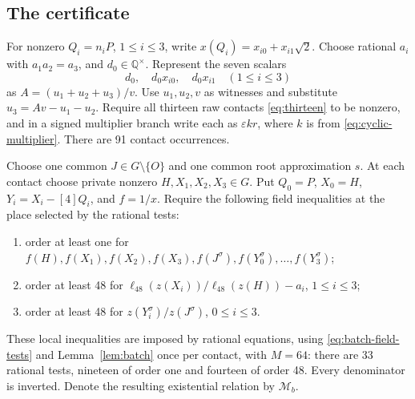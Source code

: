 \documentclass[11pt]{article}
\theoremstyle{definition}
\newcommand{\Q}{\mathbb Q}\newcommand{\Z}{\mathbb Z}
\begin{document}
\subsection{The certificate}
\label{sec:batched-multiplication}
For nonzero \(Q_i=n_iP\), \(1\le i\le3\), write
\(x(Q_i)=x_{i0}+x_{i1}\sqrt2\). Choose rational \(a_i\)
with \(a_1a_2=a_3\), and \(d_0\in\Q^\times\). Represent
the seven scalars
\begin{equation}\label{eq:shared-coordinates}
                   d_0,\quad d_0x_{i0},\quad d_0x_{i1}
                   \quad(1\le i\le3)
\end{equation}
as \(A=(u_1+u_2+u_3)/v\). Use \(u_1,u_2,v\) as witnesses
and substitute \(u_3=Av-u_1-u_2\). Require all thirteen raw
contacts \eqref{eq:thirteen} to be nonzero, and in a signed
multiplier branch write each as \(\varepsilon kr\), where \(k\)
is from \eqref{eq:cyclic-multiplier}. There are 91 contact occurrences.

Choose one common \(J\in G\setminus\{O\}\) and one common root
approximation \(s\). At each contact choose private nonzero
\(H,X_1,X_2,X_3\in G\). Put \(Q_0=P\), \(X_0=H\),
\(Y_i=X_i-[4]Q_i\), and \(f=1/x\). Require the following
field inequalities at the place selected by the rational tests:
\begin{enumerate}[label=(\roman*),leftmargin=*,itemsep=2pt]
\item order at least one for \(f(H),f(X_1),f(X_2),f(X_3),
f(J^\sigma),f(Y_0^\sigma),\ldots,f(Y_3^\sigma)\);
\item order at least 48 for
\(\ell_{48}(z(X_i))/\ell_{48}(z(H))-a_i\), \(1\le i\le3\);
\item order at least 48 for
\(z(Y_i^\sigma)/z(J^\sigma)\), \(0\le i\le3\).
\end{enumerate}
These local inequalities are imposed by rational equations, using
\eqref{eq:batch-field-tests}
and Lemma~\ref{lem:batch} once per contact, with \(M=64\): there
are 33 rational tests, nineteen of order one and fourteen of order 48.
Every denominator is inverted. Denote the resulting existential
relation by \(\mathcal M_b\).
\end{document}
